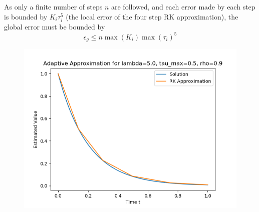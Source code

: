 \documentclass{article}
\begin{document}
\begin{itemize}
		As only a finite number of steps $n$ are followed, and each error
		made by each step is bounded by $K_i \tau_i^5$ (the local error of
		the four step RK approximation), the global error must be
		bounded by
		\[
			\epsilon_g \leq n \max(K_i) \max(\tau_i)^5
		\]
		\begin{figure}[H]
			\includegraphics[scale=0.6]{adaptive}
		\end{figure}


\end{itemize}
\end{document}
